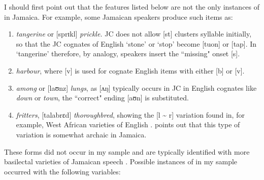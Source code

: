I should first point out that the features listed below are not the only instances of  in Jamaica.  For example, some Jamaican speakers produce such items as: 
\begin{enumerate}
\item\relax [stanʤarin] \textit{tangerine} or [sprɪkl] \textit{prickle.}  JC does not allow [st] clusters syllable initially, so that the JC cognates of English ‘stone’ or ‘stop’ become [tuon] or [tap].  In ‘tangerine’ therefore, by analogy, speakers insert the ``missing" onset [s].  
\item\relax [a:rva] \textit{harbour}, where [v] is used for cognate English items with either [b] or [v].  
\item\relax [amaʊn] \textit{among} or [laʊnz] \textit{lungs}, as [ʌŋ] typically occurs in JC in English cognates like \textit{down} or \textit{town}, the ``correct" ending [aʊn] is substituted.  
\item\relax [flɪtaz] \textit{fritters}, [talabrɛd] \textit{thoroughbred}, showing the [l {\textasciitilde} r] variation found in, for example, West African varieties of English \citep[135]{Holm1988}.  \citet[62]{Alleyne1980a} points out that this type of variation is somewhat archaic in Jamaica.
\end{enumerate}

These forms did not occur in my sample and are typically identified with more basilectal varieties of Jamaican speech \citep[40--47]{Cassidy1961}. Possible instances of  in my sample occurred with the following variables: 

